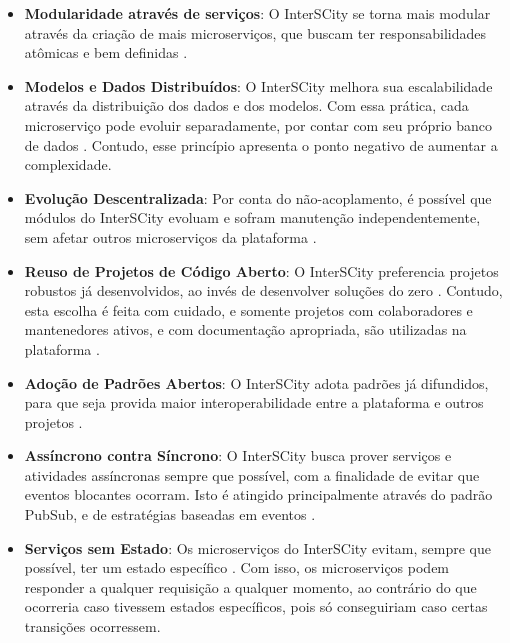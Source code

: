\begin{itemize}
    \item \textbf{Modularidade através de serviços}: O InterSCity se torna mais
modular através da criação de mais microserviços, que buscam ter
responsabilidades atômicas e bem definidas \cite{delesposte2017}.

    \item \textbf{Modelos e Dados Distribuídos}: O InterSCity melhora sua
escalabilidade através da distribuição dos dados e dos modelos. Com essa
prática, cada microserviço pode evoluir separadamente, por contar com seu
próprio banco de dados \cite{delesposte2017}. Contudo, esse princípio apresenta
o ponto negativo de aumentar a complexidade.

    \item \textbf{Evolução Descentralizada}: Por conta do não-acoplamento, é
possível que módulos do InterSCity evoluam e sofram manutenção
independentemente, sem afetar outros microserviços da plataforma
\cite{delesposte2017}.

    \item \textbf{Reuso de Projetos de Código Aberto}: O InterSCity preferencia %
projetos robustos já desenvolvidos, ao invés de desenvolver soluções do zero
\cite{delesposte2017}. Contudo, esta escolha é feita com cuidado, e somente
projetos com colaboradores e mantenedores ativos, e com documentação
apropriada, são utilizadas na plataforma \cite{delesposte2017}.

    \item \textbf{Adoção de Padrões Abertos}: O InterSCity adota padrões já
difundidos, para que seja provida maior interoperabilidade entre a plataforma
e outros projetos \cite{delesposte2017}.

    \item \textbf{Assíncrono contra Síncrono}: O InterSCity busca prover
serviços e atividades assíncronas sempre que possível, com a finalidade de
evitar que eventos blocantes ocorram. Isto é atingido principalmente através
do padrão PubSub, e de estratégias baseadas em eventos \cite{delesposte2017}.

    \item \textbf{Serviços sem Estado}: Os microserviços do InterSCity evitam,
sempre que possível, ter um estado específico \cite{delesposte2017}. Com isso,
os microserviços podem responder a qualquer requisição a qualquer momento, ao
contrário do que ocorreria caso tivessem estados específicos, pois só
conseguiriam caso certas transições ocorressem.
\end{itemize}

